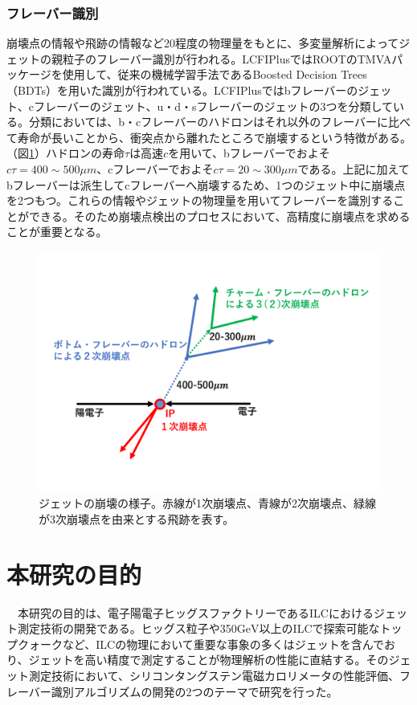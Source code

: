\subsubsection{フレーバー識別}
崩壊点の情報や飛跡の情報など20程度の物理量をもとに、多変量解析によってジェットの親粒子のフレーバー識別が行われる。LCFIPlusではROOTのTMVAパッケージを使用して、従来の機械学習手法であるBoosted Decision Trees（BDTs）を用いた識別が行われている。LCFIPlusではbフレーバーのジェット、cフレーバーのジェット、u・d・sフレーバーのジェットの3つを分類している。分類においては、b・cフレーバーのハドロンはそれ以外のフレーバーに比べて寿命が長いことから、衝突点から離れたところで崩壊するという特徴がある。（図\ref{bcjets}）ハドロンの寿命$\tau$は高速$c$を用いて、bフレーバーでおよそ$c\tau = 400 \sim 500 \mu m$、cフレーバーでおよそ$c\tau = 20 \sim 300 \mu m$である。上記に加えてbフレーバーは派生してcフレーバーへ崩壊するため、1つのジェット中に崩壊点を2つもつ。これらの情報やジェットの物理量を用いてフレーバーを識別することができる。そのため崩壊点検出のプロセスにおいて、高精度に崩壊点を求めることが重要となる。
\begin{figure}[H]
	\begin{center}
 \includegraphics[keepaspectratio, scale=0.4]
 	{Figure/Introduction/bcjets.pdf}
 		\caption {ジェットの崩壊の様子。赤線が1次崩壊点、青線が2次崩壊点、緑線が3次崩壊点を由来とする飛跡を表す。}
 		\label{bcjets}
	\end{center}
\end{figure}
\section{本研究の目的}
　本研究の目的は、電子陽電子ヒッグスファクトリーであるILCにおけるジェット測定技術の開発である。ヒッグス粒子や350$\mathrm{GeV}$以上のILCで探索可能なトップクォークなど、ILCの物理において重要な事象の多くはジェットを含んでおり、ジェットを高い精度で測定することが物理解析の性能に直結する。そのジェット測定技術において、シリコンタングステン電磁カロリメータの性能評価、フレーバー識別アルゴリズムの開発の2つのテーマで研究を行った。\\
